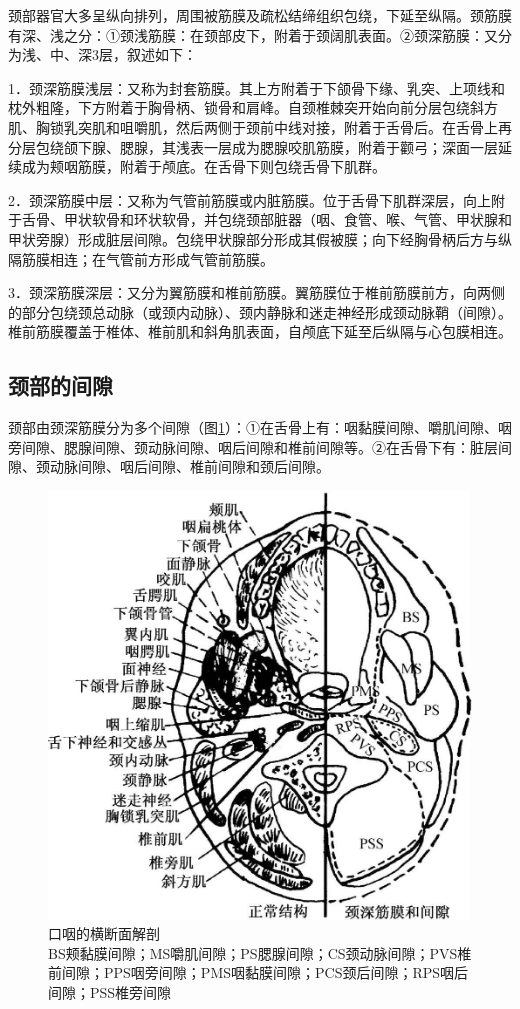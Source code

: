 颈部器官大多呈纵向排列，周围被筋膜及疏松结缔组织包绕，下延至纵隔。颈筋膜有深、浅之分：①颈浅筋膜：在颈部皮下，附着于颈阔肌表面。②颈深筋膜：又分为浅、中、深3层，叙述如下：

1．颈深筋膜浅层：又称为封套筋膜。其上方附着于下颌骨下缘、乳突、上项线和枕外粗隆，下方附着于胸骨柄、锁骨和肩峰。自颈椎棘突开始向前分层包绕斜方肌、胸锁乳突肌和咀嚼肌，然后两侧于颈前中线对接，附着于舌骨后。在舌骨上再分层包绕颌下腺、腮腺，其浅表一层成为腮腺咬肌筋膜，附着于颧弓；深面一层延续成为颊咽筋膜，附着于颅底。在舌骨下则包绕舌骨下肌群。

2．颈深筋膜中层：又称为气管前筋膜或内脏筋膜。位于舌骨下肌群深层，向上附于舌骨、甲状软骨和环状软骨，并包绕颈部脏器（咽、食管、喉、气管、甲状腺和甲状旁腺）形成脏层间隙。包绕甲状腺部分形成其假被膜；向下经胸骨柄后方与纵隔筋膜相连；在气管前方形成气管前筋膜。

3．颈深筋膜深层：又分为翼筋膜和椎前筋膜。翼筋膜位于椎前筋膜前方，向两侧的部分包绕颈总动脉（或颈内动脉）、颈内静脉和迷走神经形成颈动脉鞘（间隙）。椎前筋膜覆盖于椎体、椎前肌和斜角肌表面，自颅底下延至后纵隔与心包膜相连。

\subsection{颈部的间隙}

颈部由颈深筋膜分为多个间隙（图\ref{fig8-2}）：①在舌骨上有：咽黏膜间隙、嚼肌间隙、咽旁间隙、腮腺间隙、颈动脉间隙、咽后间隙和椎前间隙等。②在舌骨下有：脏层间隙、颈动脉间隙、咽后间隙、椎前间隙和颈后间隙。

\begin{figure}[!htbp]
 \centering
 \includegraphics[width=.7\textwidth,height=\textheight,keepaspectratio]{./images/Image00168.jpg}
 \captionsetup{justification=centering}
 \caption{口咽的横断面解剖\\{\small BS颊黏膜间隙；MS嚼肌间隙；PS腮腺间隙；CS颈动脉间隙；PVS椎前间隙；PPS咽旁间隙；PMS咽黏膜间隙；PCS颈后间隙；RPS咽后间隙；PSS椎旁间隙}}
 \label{fig8-2}
  \end{figure} 

